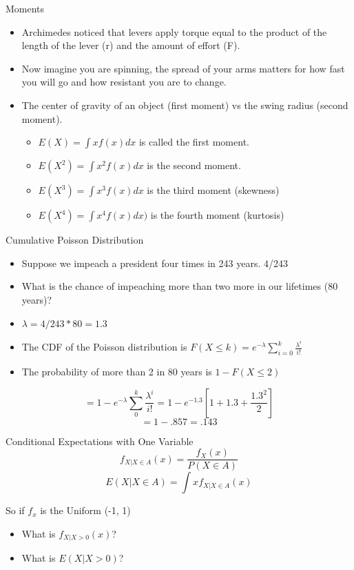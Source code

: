 \documentclass{beamer}
\numberwithin{equation}{section}
\begin{document}
\begin{frame}{Moments}
\begin{itemize}
\item Archimedes noticed that levers apply torque equal to the product of the length of the lever (r) and the amount of effort (F). \pause
\item Now imagine you are spinning, the spread of your arms matters for how fast you will go and how resistant you are to change.\pause
\item The center of gravity of an object (first moment) vs the swing radius (second moment).\pause
\begin{itemize}
\item $E(X)=\int x f(x)dx$ is called the first moment.
\item $E(X^2)=\int x^2 f(x)dx$ is the second moment.
\item $E(X^3)=\int x^3 f(x)dx$ is the third moment (skewness)
\item $E(X^4)=\int x^4 f(x)dx)$ is the fourth moment (kurtosis)
\end{itemize}
\end{itemize}
\end{frame}



\begin{frame}{Cumulative Poisson Distribution}

\begin{itemize}
\item Suppose we impeach a president four times in 243 years.  4/243 \pause
\item What is the chance of impeaching more than two more in our lifetimes (80 years)? \pause
\item $\lambda= 4/243*80 =1.3$ \pause
\item The CDF of the Poisson distribution is $F(X\leq k)=e^{-\lambda}\sum_{i=0}^k \frac{\lambda^i}{i!}$ \pause
\item The probability of more than 2 in 80 years is $1-F(X\leq 2)$ \pause
\end{itemize}

$$=1-e^{-\lambda}\sum_0^k \frac{\lambda^i}{i!}=1-e^{-1.3}[ 1+ 1.3+ \frac{1.3^2}{2}]$$
$$=1-.857=.143$$
\end{frame}


\begin{frame}{Conditional Expectations with One Variable}
$$f_{X|{X\in A}}(x)=\frac{f_X(x)}{P(X\in A)}$$
$$E(X|X\in A)=\int x f_{X|{X\in A}}(x)$$

So if $f_x$ is the Uniform (-1, 1)
\begin{itemize}
\item What is $f_{X|X>0}(x)$?
\item What is $E(X|X>0)$?
\end{itemize}
\end{frame}
\end{document}
